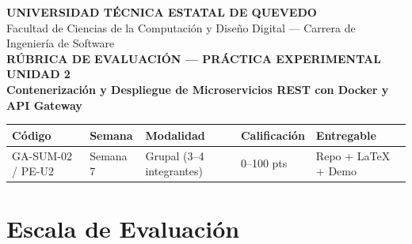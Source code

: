\documentclass[11pt,a4paper,landscape]{article}
\begin{document}
	
	\begin{center}
		{\Large\bfseries\color{primary} UNIVERSIDAD T\'ECNICA ESTATAL DE QUEVEDO}\\[2pt]
		{\small\color{graytext} Facultad de Ciencias de la Computaci\'on y Dise\~no Digital --- Carrera de Ingenier\'ia de Software}\\[8pt]
		{\large\bfseries\color{secondary} R\'UBRICA DE EVALUACI\'ON --- PR\'ACTICA EXPERIMENTAL UNIDAD 2}\\[4pt]
		{\normalsize\bfseries\color{primary} Contenerizaci\'on y Despliegue de Microservicios REST con Docker y API Gateway}
	\end{center}
	
	\vspace{4pt}
	
	\begin{center}
		\begin{tabular}{|C{4.5cm}|C{3.5cm}|C{5cm}|C{3cm}|C{4cm}|}
			\hline
			\color{white}\textbf{C\'odigo} & \color{white}\textbf{Semana} & \color{white}\textbf{Modalidad} & \color{white}\textbf{Calificaci\'on} & \color{white}\textbf{Entregable}\\
			\hline
			GA-SUM-02 / PE-U2 & Semana 7 & Grupal (3--4 integrantes) & 0--100 pts & Repo + LaTeX + Demo\\
			\hline
		\end{tabular}
	\end{center}
	
	\vspace{4pt}
	
	\section{Escala de Evaluaci\'on}
	
\end{document}
